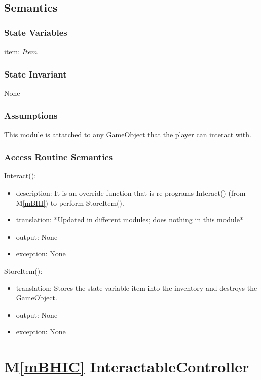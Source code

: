 \documentclass[12pt]{article}
\newcommand{\mref}[1]{M\ref{#1}}
\begin{document}
\subsection* {Semantics}

\subsubsection* {State Variables}

item: $Item$

\subsubsection* {State Invariant}

None

\subsubsection* {Assumptions}

This module is attatched to any GameObject that the player can interact with. 

\subsubsection* {Access Routine Semantics}

\noindent Interact():
\begin{itemize}
\item description: It is an override function that is re-programs Interact() (from \mref{mBHI}) to perform StoreItem().
\item translation: *Updated in different modules; does nothing in this module*
\item output: None
\item exception: None
\end{itemize}

\noindent StoreItem():
\begin{itemize}
\item translation: Stores the state variable item into the inventory and destroys the GameObject.
\item output: None
\item exception: None
\end{itemize}

\newpage

\section* {\mref{mBHIC} InteractableController}
\end{document}
